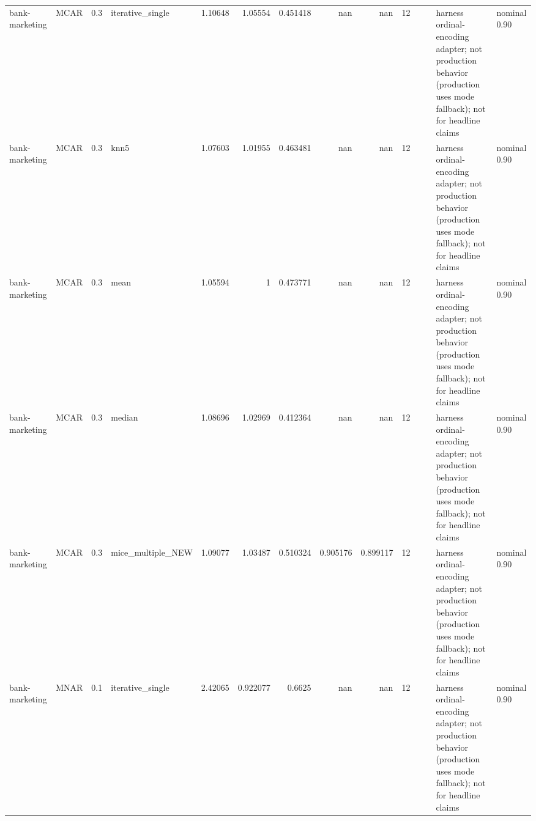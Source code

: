 \begin{table}[ht]
\begin{tabular}{llrlrrrrrrllll}
 bank-marketing       & MCAR        &         0.3 & iterative\_single  &       1.10648  &             1.05554  &                 0.451418 &                     nan        &                       nan        &        12 &                    &                                         & harness ordinal-encoding adapter; not production behavior (production uses mode fallback); not for headline claims & nominal 0.90              \\
 bank-marketing       & MCAR        &         0.3 & knn5              &       1.07603  &             1.01955  &                 0.463481 &                     nan        &                       nan        &        12 &                    &                                         & harness ordinal-encoding adapter; not production behavior (production uses mode fallback); not for headline claims & nominal 0.90              \\
 bank-marketing       & MCAR        &         0.3 & mean              &       1.05594  &             1        &                 0.473771 &                     nan        &                       nan        &        12 &                    &                                         & harness ordinal-encoding adapter; not production behavior (production uses mode fallback); not for headline claims & nominal 0.90              \\
 bank-marketing       & MCAR        &         0.3 & median            &       1.08696  &             1.02969  &                 0.412364 &                     nan        &                       nan        &        12 &                    &                                         & harness ordinal-encoding adapter; not production behavior (production uses mode fallback); not for headline claims & nominal 0.90              \\
 bank-marketing       & MCAR        &         0.3 & mice\_multiple\_NEW &       1.09077  &             1.03487  &                 0.510324 &                       0.905176 &                         0.899117 &        12 &                    &                                         & harness ordinal-encoding adapter; not production behavior (production uses mode fallback); not for headline claims & nominal 0.90              \\
 bank-marketing       & MNAR        &         0.1 & iterative\_single  &       2.42065  &             0.922077 &                 0.6625   &                     nan        &                       nan        &        12 &                    &                                         & harness ordinal-encoding adapter; not production behavior (production uses mode fallback); not for headline claims & nominal 0.90              \\

\end{tabular}
\end{table}
